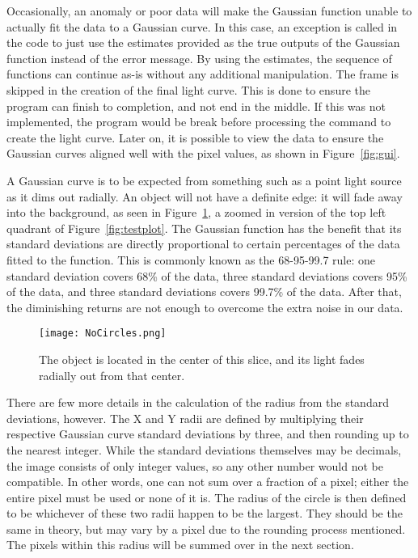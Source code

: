 Occasionally, an anomaly or poor data will make the Gaussian function unable to actually fit the data to a Gaussian curve. In this case, an exception is called in the code to just use the estimates provided as the true outputs of the Gaussian function instead of the error message. By using the estimates, the sequence of functions can continue as-is without any additional manipulation. The frame is skipped in the creation of the final light curve. This is done to ensure the program can finish to completion, and not end in the middle. If this was not implemented, the program would be break before processing the command to create the light curve. Later on, it is possible to view the data to ensure the Gaussian curves aligned well with the pixel values, as shown in Figure~\ref{fig:gui}.

A Gaussian curve is to be expected from something such as a point light source as it dims out radially. An object will not have a definite edge: it will fade away into the background, as seen in Figure~\ref{fig:NoCircles}, a zoomed in version of the top left quadrant of Figure~\ref{fig:testplot}. The Gaussian function has the benefit that its standard deviations are directly proportional to certain percentages of the data fitted to the function. This is commonly known as the 68-95-99.7 rule: one standard deviation covers 68\% of the data, three standard deviations covers 95\% of the data, and three standard deviations covers 99.7\% of the data. After that, the diminishing returns are not enough to overcome the extra noise in our data.

\begin{figure}[ht!]
	\centering
	\texttt{[image: NoCircles.png]}
	\caption{The object is located in the center of this slice, and its light fades radially out from that center.}
	\label{fig:NoCircles}
\end{figure}

There are few more details in the calculation of the radius from the standard deviations, however. The X and Y radii are defined by multiplying their respective Gaussian curve standard deviations by three, and then rounding up to the nearest integer. While the standard deviations themselves may be decimals, the image consists of only integer values, so any other number would not be compatible. In other words, one can not sum over a fraction of a pixel; either the entire pixel must be used or none of it is. The radius of the circle is then defined to be whichever of these two radii happen to be the largest. They should be the same in theory, but may vary by a pixel due to the rounding process mentioned. The pixels within this radius will be summed over in the next section. 


